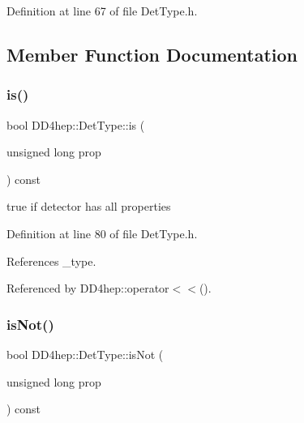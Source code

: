 Definition at line 67 of file Det\+Type.\+h.



\subsection{Member Function Documentation}
\hypertarget{class_d_d4hep_1_1_det_type_a8f70ec4a013ffa7e58c7481b565e1ae1}{}\label{class_d_d4hep_1_1_det_type_a8f70ec4a013ffa7e58c7481b565e1ae1} 
\subsubsection{\texorpdfstring{is()}{is()}}
{\footnotesize\ttfamily bool D\+D4hep\+::\+Det\+Type\+::is (\begin{DoxyParamCaption}\item[{unsigned long}]{prop }\end{DoxyParamCaption}) const\hspace{0.3cm}{\ttfamily [inline]}}



true if detector has all properties 



Definition at line 80 of file Det\+Type.\+h.



References \+\_\+type.



Referenced by D\+D4hep\+::operator$<$$<$().

\hypertarget{class_d_d4hep_1_1_det_type_adf7836446a540b8e8eb10cd14887086f}{}\label{class_d_d4hep_1_1_det_type_adf7836446a540b8e8eb10cd14887086f} 
\subsubsection{\texorpdfstring{is\+Not()}{isNot()}}
{\footnotesize\ttfamily bool D\+D4hep\+::\+Det\+Type\+::is\+Not (\begin{DoxyParamCaption}\item[{unsigned long}]{prop }\end{DoxyParamCaption}) const\hspace{0.3cm}{\ttfamily [inline]}}



